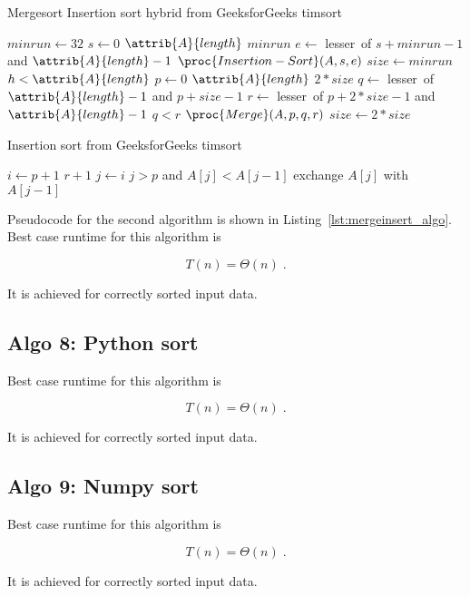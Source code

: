 \documentclass[twocolumn, sigconf, nonacm, natbib, screen, balance=False]{acmart}
\begin{document}
\begin{listing}
  \caption{Mergesort Insertion sort hybrid from GeeksforGeeks timsort}
  \label{lst:mergeinsert_algo}
  \begin{codebox}
    \li $minrun \gets 32$
    \li \For $s \gets 0$ \To $\attrib{A}{length}$ \By $minrun$
    \li \Do $e \gets$ lesser~of $s+minrun-1$ and $\attrib{A}{length}-1$
    \li		$\proc{Insertion-Sort}(A, s, e)$
    \End
    \li $size \gets minrun$
    \li \While $h<\attrib{A}{length}$
    \li \Do \For $p \gets 0$ \To $\attrib{A}{length}$ \By $2*size$
    \li 	\Do $q \gets$ lesser~of $\attrib{A}{length}-1$ and $p+size-1$
    \li			$r \gets$ lesser~of $p+2*size-1$ and $\attrib{A}{length}-1$
    \li			\If $q<r$
    \li 		\Do $\proc{Merge}(A, p, q, r)$
    \End
    \End
    \li 	$size \gets 2*size$
    \End		
  \end{codebox}
\end{listing}

\begin{listing}
  \caption{Insertion sort from GeeksforGeeks timsort}
  \label{lst:insert_algo}
  \begin{codebox}
    \li \For $i \gets p+1$ \To $r+1$
    \li \Do $j \gets i$
    \li 	\While $j>p$ and $A[j]<A[j-1]$
    \li		\Do exchange $A[j]$ with $A[j-1]$
    \End
    \End		
  \end{codebox}
\end{listing}

Pseudocode for the second algorithm is shown in
Listing~\ref{lst:mergeinsert_algo}. Best case runtime for this algorithm
is

\begin{equation}
  T(n) = \Theta(n) \;.  \label{eq:ins_sort_best}
\end{equation}

It is achieved for correctly sorted input data.

\subsection{Algo 8: Python sort}\label{sec:algo8}

Best case runtime for this algorithm is

\begin{equation}
  T(n) = \Theta(n) \;.  \label{eq:ins_sort_best}
\end{equation}

It is achieved for correctly sorted input data.

\subsection{Algo 9: Numpy sort}\label{sec:algo9}

Best case runtime for this algorithm is

\begin{equation}
  T(n) = \Theta(n) \;.  \label{eq:ins_sort_best}
\end{equation}

It is achieved for correctly sorted input data.
\end{document}
